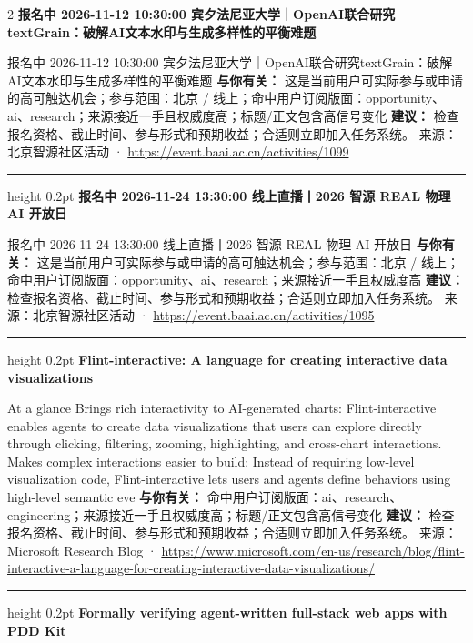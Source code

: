 \documentclass[10.5pt]{ctexart}
\begin{document}
\begin{multicols}{2}
{\large\bfseries 报名中 2026-11-12 10:30:00 宾夕法尼亚大学｜OpenAI联合研究textGrain：破解AI文本水印与生成多样性的平衡难题}\par
报名中 2026-11-12 10:30:00 宾夕法尼亚大学｜OpenAI联合研究textGrain：破解AI文本水印与生成多样性的平衡难题
\textbf{与你有关：} 这是当前用户可实际参与或申请的高可触达机会；参与范围：北京 / 线上；命中用户订阅版面：opportunity、ai、research；来源接近一手且权威度高；标题/正文包含高信号变化
\textbf{建议：} 检查报名资格、截止时间、参与形式和预期收益；合适则立即加入任务系统。
{\footnotesize\color{ormuted} 来源：北京智源社区活动 · \url{https://event.baai.ac.cn/activities/1099}}
\vspace{2mm}
\hrule height 0.2pt
\vspace{2mm}
{\large\bfseries 报名中 2026-11-24 13:30:00 线上直播丨2026 智源 REAL 物理 AI 开放日}\par
报名中 2026-11-24 13:30:00 线上直播丨2026 智源 REAL 物理 AI 开放日
\textbf{与你有关：} 这是当前用户可实际参与或申请的高可触达机会；参与范围：北京 / 线上；命中用户订阅版面：opportunity、ai、research；来源接近一手且权威度高
\textbf{建议：} 检查报名资格、截止时间、参与形式和预期收益；合适则立即加入任务系统。
{\footnotesize\color{ormuted} 来源：北京智源社区活动 · \url{https://event.baai.ac.cn/activities/1095}}
\vspace{2mm}
\hrule height 0.2pt
\vspace{2mm}
{\large\bfseries Flint-interactive: A language for creating interactive data visualizations}\par
At a glance Brings rich interactivity to AI-generated charts: Flint-interactive enables agents to create data visualizations that users can explore directly through clicking, filtering, zooming, highlighting, and cross-chart interactions. Makes complex interactions easier to build: Instead of requiring low-level visualization code, Flint-interactive lets users and agents define behaviors using high-level semantic eve
\textbf{与你有关：} 命中用户订阅版面：ai、research、engineering；来源接近一手且权威度高；标题/正文包含高信号变化
\textbf{建议：} 检查报名资格、截止时间、参与形式和预期收益；合适则立即加入任务系统。
{\footnotesize\color{ormuted} 来源：Microsoft Research Blog · \url{https://www.microsoft.com/en-us/research/blog/flint-interactive-a-language-for-creating-interactive-data-visualizations/}}
\vspace{2mm}
\hrule height 0.2pt
\vspace{2mm}
{\large\bfseries Formally verifying agent-written full-stack web apps with PDD Kit}\par

\end{multicols}
\end{document}
